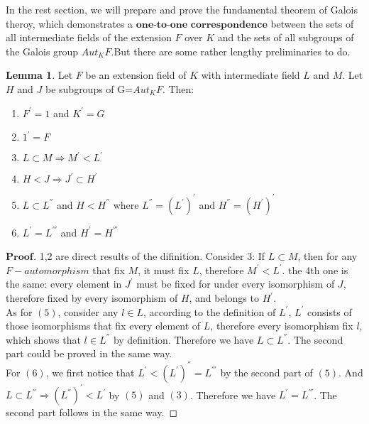 \documentclass[a4paper, 11pt]{article}
\theoremstyle{remark}
\newenvironment{myprf}
{\renewcommand\qedsymbol{$ $}\begin{proof}[$\mathbf{Proof}$]}
  {\end{proof}}
\theoremstyle{definition}
\newtheorem{lemma}[theorem]{Lemma}
\begin{document}
    \vspace{0.5cm}
    In the rest section, we will prepare and prove the fundamental theorem of Galois
    theroy, which demonstrates a $\textbf{one-to-one correspondence}$ between the sets of all intermediate
    fields of the extension $F$ over $K$ and the sets of all subgroups of the Galois group
    $Aut_KF$.But there are some rather lengthy preliminaries to do.
    \vspace{0.5cm}

    \begin{lemma}
        Let $F$ be an extension field of $K$ with intermediate field $L$ and $M$. Let $H$ and $J$ be
        subgroups of G=$Aut_KF$. Then:
        \begin{enumerate}
                \item $F^{'}=1$ and $K^{'}=G$ 
                \item $1^{'}=F $
                \item $L\subset M \Rightarrow M^{'}<L^{'}$
                \item $H<J\Rightarrow J^{'}\subset H^{'}$
                \item $L\subset L^{''}$ and $H < H^{''}$ where $L^{''}=(L^{'})^{'}$ and $H^{''}=(H^{'})^{'} $
                \item $L^{'}=L^{'''}$ and $H^{'}=H^{'''}$
        \end{enumerate}                    
    \end{lemma}
    \vspace{0.3cm}
    \begin{myprf}
        1,2 are direct results of the difinition. Consider 3: If $L\subset M$, then 
        for any $F-automorphism$ that fix $M$, it must fix $L$, therefore $M^{'}< L^{'}$.
        the 4th one is the same: every element in $J^{'}$ must be fixed for under every
        isomorphism of $J$, therefore fixed by every isomorphism of $H$, and belongs to
        $H^{'}$.\\
        As for $(5)$, consider any $l\in L$, according to the definition of $L^{'}$, $L^{'}$ consists of those isomorphisms that fix every element of $L$, therefore every 
        isomorphism fix $l$, which shows that $l\in L^{''}$ by definition. Therefore we 
        have $L\subset L^{''}$. The second part could be proved in the same way.\\
        For $(6)$, we first notice that $L^{'}<(L^{'})^{''}=L^{'''}$ by the second 
        part of $(5)$. And $L\subset L^{''}\Rightarrow (L^{''})^{'}<L^{'}$ by $(5)$
        and $(3)$. Therefore we have $L^{'}=L^{'''}$. The second part follows in the same
        way.

    \end{myprf}
\end{document}
